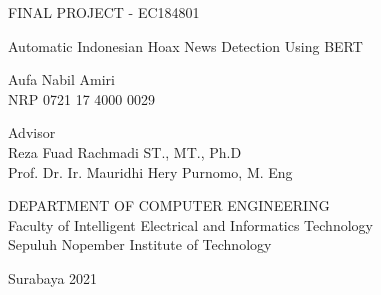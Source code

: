 FINAL PROJECT - EC184801

\vspace{6ex}

\begin{large}
    Automatic Indonesian Hoax News Detection Using BERT
\end{large}

\vspace{4ex}

Aufa Nabil Amiri \\
NRP 0721 17 4000 0029

\vspace{2ex}

Advisor \\
Reza Fuad Rachmadi ST., MT., Ph.D \\
Prof. Dr. Ir. Mauridhi Hery Purnomo, M. Eng

\vspace{6ex}

DEPARTMENT OF COMPUTER ENGINEERING \\
Faculty of Intelligent Electrical and Informatics Technology \\
Sepuluh Nopember Institute of Technology

Surabaya 2021
